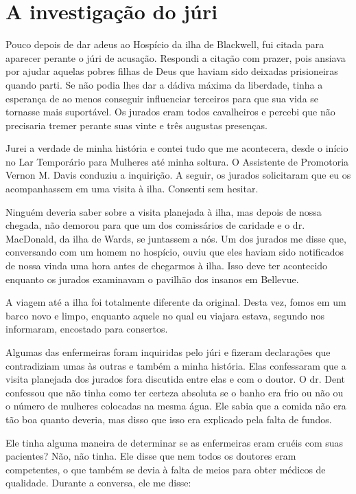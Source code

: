 \chapter{A investigação do
júri}\label{capuxedtulo-xvii-a-investigauxe7uxe3o-do-juxfari}

Pouco depois de dar adeus ao Hospício da ilha de Blackwell, fui citada
para aparecer perante o júri de acusação. Respondi a citação com prazer,
pois ansiava por ajudar aquelas pobres filhas de Deus que haviam sido
deixadas prisioneiras quando parti. Se não podia lhes dar a dádiva
máxima da liberdade, tinha a esperança de ao menos conseguir influenciar
terceiros para que sua vida se tornasse mais suportável. Os jurados eram
todos cavalheiros e percebi que não precisaria tremer perante suas vinte
e três augustas presenças.

Jurei a verdade de minha história e contei tudo que me acontecera, desde
o início no Lar Temporário para Mulheres até minha soltura. O Assistente
de Promotoria Vernon M. Davis conduziu a inquirição. A seguir, os
jurados solicitaram que eu os acompanhassem em uma visita à ilha.
Consenti sem hesitar.

Ninguém deveria saber sobre a visita planejada à ilha, mas depois de
nossa chegada, não demorou para que um dos comissários de caridade e o
dr. MacDonald, da ilha de Wards, se juntassem a nós. Um dos jurados me
disse que, conversando com um homem no hospício, ouviu que eles haviam
sido notificados de nossa vinda uma hora antes de chegarmos à ilha. Isso
deve ter acontecido enquanto os jurados examinavam o pavilhão dos
insanos em Bellevue.

A viagem até a ilha foi totalmente diferente da original. Desta vez,
fomos em um barco novo e limpo, enquanto aquele no qual eu viajara
estava, segundo nos informaram, encostado para consertos.

Algumas das enfermeiras foram inquiridas pelo júri e fizeram declarações
que contradiziam umas às outras e também a minha história. Elas
confessaram que a visita planejada dos jurados fora discutida entre elas
e com o doutor. O dr. Dent confessou que não tinha como ter certeza
absoluta se o banho era frio ou não ou o número de mulheres colocadas na
mesma água. Ele sabia que a comida não era tão boa quanto deveria, mas
disso que isso era explicado pela falta de fundos.

Ele tinha alguma maneira de determinar se as enfermeiras eram cruéis com
suas pacientes? Não, não tinha. Ele disse que nem todos os doutores eram
competentes, o que também se devia à falta de meios para obter médicos
de qualidade. Durante a conversa, ele me disse:

